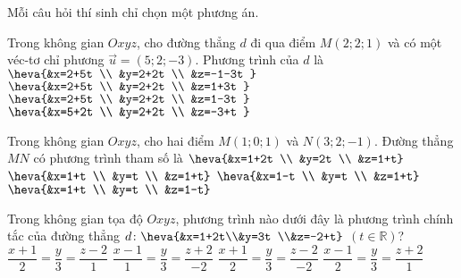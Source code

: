 \TN
Mỗi câu hỏi thí sinh chỉ chọn một phương án.
\begin{ex}%
	Trong không gian $Oxyz$, cho đường thẳng $d$ đi qua điểm $M(2; 2; 1)$ và có một véc-tơ chỉ phương $\overrightarrow{u}=(5; 2;-3)$. Phương trình của $d$ là
	\choice
	{$\heva{&x=2+5t \\
			&y=2+2t \\
			&z=-1-3t
		}$}
	{$\heva{&x=2+5t \\
			&y=2+2t \\
			&z=1+3t
		}$}
	{\True $\heva{&x=2+5t \\
			&y=2+2t \\
			&z=1-3t
		}$}
	{$\heva{&x=5+2t \\
			&y=2+2t \\
			&z=-3+t
		}$}
\end{ex}
\begin{ex}%
	Trong không gian $Oxyz$, cho hai điểm $M(1; 0; 1)$ và $N(3; 2;-1)$. Đường thẳng $MN$ có phương trình tham số là
	\choice
	{$\heva{&x=1+2t \\
			&y=2t \\
			&z=1+t}$}
	{$\heva{&x=1+t \\
			&y=t \\
			&z=1+t}$}
	{$\heva{&x=1-t \\
			&y=t \\
			&z=1+t}$}
	{\True $\heva{&x=1+t \\
			&y=t \\
			&z=1-t}$}
\end{ex}
	\begin{ex}%
		Trong không gian tọa độ $Oxyz$, phương trình nào dưới đây là phương trình chính tắc của đường thẳng $d\colon\heva{&x=1+2t\\&y=3t \\&z=-2+t}$ $(t\in\mathbb{R})$?
		\choice
		{$\dfrac{x+1}{2}=\dfrac{y}{3}=\dfrac{z-2}{1}$}
		{$\dfrac{x-1}{1}=\dfrac{y}{3}=\dfrac{z+2}{-2}$}
		{$\dfrac{x+1}{2}=\dfrac{y}{3}=\dfrac{z-2}{-2}$}
		{\True $\dfrac{x-1}{2}=\dfrac{y}{3}=\dfrac{z+2}{1}$}
\end{ex}
